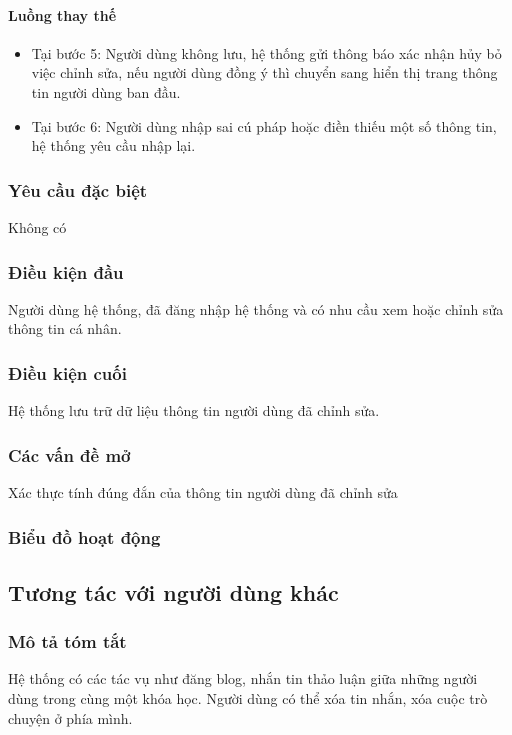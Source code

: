 \documentclass[./../main_file.tex]{subfiles}
\begin{document}
\paragraph{Luồng thay thế}
\begin{itemize}
	\item Tại bước 5: Người dùng không lưu, hệ thống gửi thông báo xác nhận hủy bỏ việc chỉnh sửa, nếu người dùng đồng ý thì chuyển sang hiển thị trang thông tin người dùng ban đầu.
	\item Tại bước 6: Người dùng nhập sai cú pháp hoặc điền thiếu một số thông tin, hệ thống yêu cầu nhập lại.
	
\end{itemize}
\subsubsection{Yêu cầu đặc biệt}
Không có

\subsubsection{Điều kiện đầu}
Người dùng hệ thống, đã đăng nhập hệ thống và có nhu cầu xem hoặc chỉnh sửa thông tin cá nhân.

\subsubsection{Điều kiện cuối}
Hệ thống lưu trữ dữ liệu thông tin người dùng đã chỉnh sửa.

\subsubsection{Các vấn đề mở}
Xác thực tính đúng đắn của thông tin người dùng đã chỉnh sửa

\subsubsection{Biểu đồ hoạt động}

\subsection{Tương tác với người dùng khác}
\subsubsection{Mô tả tóm tắt}
Hệ thống có các tác vụ như đăng blog, nhắn tin thảo luận giữa những người dùng trong cùng một khóa học. Người dùng có thể xóa tin nhắn, xóa cuộc trò chuyện ở phía mình.
\end{document}
